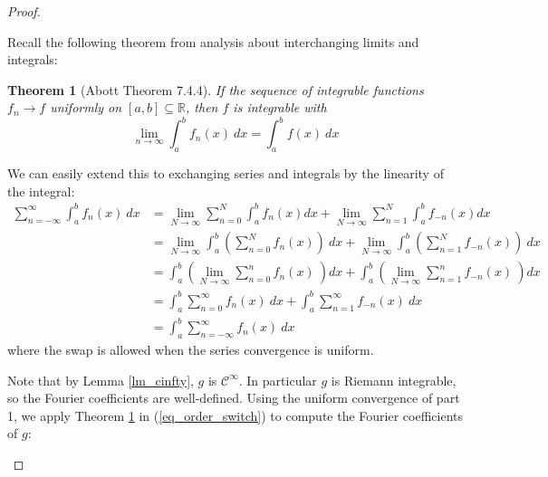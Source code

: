 \documentclass[12pt, reqno]{article}
\newtheorem{theorem}{Theorem}[section]
\theoremstyle{definition}
\theoremstyle{remark}
\begin{document}
\begin{itemize}
\begin{proof}
\begin{enumerate}
        \vspace*{10 pt}

        Recall the following theorem from analysis about interchanging limits and integrals:
        
        \begin{theorem}[Abott Theorem 7.4.4] \label{th_abott}
            If the sequence of integrable functions $f_n\to f$ uniformly on $[a,b]\subseteq \mathbb{R}$, then $f$ is integrable with 
            \[
                \lim_{n\to\infty}\int_{a}^b f_n(x)\ dx=\int_a^b f(x)\ dx
            \]
            
        \end{theorem}

        We can easily extend this to exchanging series and integrals by the linearity of the integral: 
        \begin{align*}
            \sum_{n=-\infty}^\infty \int_a^b f_n(x)\ dx &=\lim_{N\to\infty}\sum_{n=0}^N\int_a^b f_n(x)dx+\lim_{N\to\infty}\sum_{n=1}^N\int_a^b f_{-n}(x)dx\\
            &=\lim_{N\to\infty}\int_a^b\left(\sum_{n=0}^N f_n(x)\right)\ dx+\lim_{N\to\infty}\int_a^b\left(\sum_{n=1}^N f_{-n}(x)\right)\ dx\\
            &= \int_{a}^b\left(\lim_{N\to\infty}\sum_{n=0}^nf_n(x)\ \right)dx+\int_{a}^b\left(\lim_{N\to\infty}\sum_{n=1}^nf_{-n}(x)\ \right)dx\\
            &= \int_a^b\sum_{n=0}^\infty f_n(x)\ dx+\int_a^b\sum_{n=1}^\infty f_{-n}(x)\ dx\\
            &= \int_a^b\sum_{n=-\infty}^\infty f_n(x)\ dx
        \end{align*}
        where the swap is allowed when the series convergence is uniform.
        
        \vspace*{10 pt}        

        Note that by Lemma \ref{lm_cinfty}, $g$ is $\mathcal{C}^{\infty}$. In particular $g$ is Riemann integrable, so the Fourier coefficients are well-defined. Using the uniform convergence of part 1, we apply Theorem \ref{th_abott} in (\ref{eq_order_switch}) to compute the Fourier coefficients of $g$:
        

\end{enumerate}
\end{proof}
\end{itemize}
\end{document}
